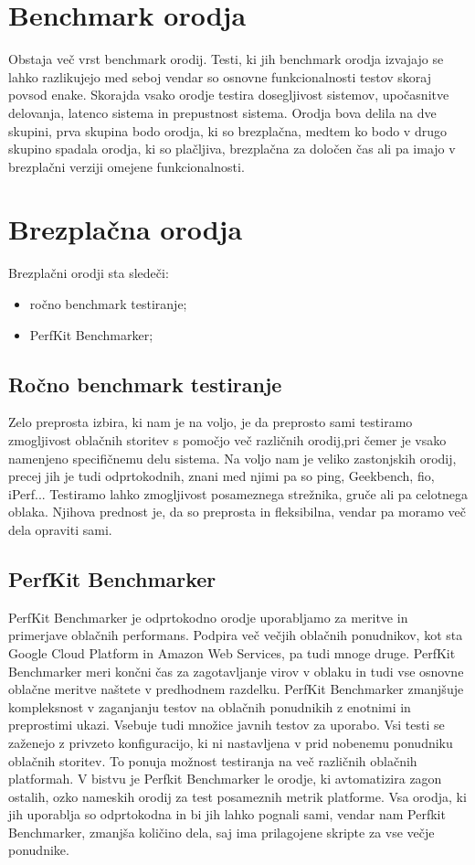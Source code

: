 \section{Benchmark orodja}
Obstaja več vrst benchmark orodij. Testi, ki jih benchmark orodja izvajajo se lahko razlikujejo med seboj vendar so osnovne funkcionalnosti testov skoraj povsod enake. Skorajda vsako orodje testira dosegljivost sistemov, upočasnitve delovanja, latenco sistema in prepustnost sistema. Orodja bova delila na dve skupini, prva skupina bodo orodja, ki so brezplačna, medtem ko bodo v drugo skupino spadala orodja, ki so plačljiva, brezplačna za določen čas ali pa imajo v brezplačni verziji omejene funkcionalnosti.

\section{Brezplačna orodja}
Brezplačni orodji sta sledeči:
\begin{itemize}
\item ročno benchmark testiranje;
\item PerfKit Benchmarker;
\end{itemize}

\subsection{Ročno benchmark testiranje}
Zelo preprosta izbira, ki nam je na voljo, je da preprosto sami testiramo zmogljivost oblačnih storitev s pomočjo več različnih orodij,pri čemer je vsako namenjeno specifičnemu delu sistema. Na voljo nam je veliko zastonjskih orodij, precej jih je tudi odprtokodnih, znani med njimi pa so ping, Geekbench, fio, iPerf... Testiramo lahko zmogljivost posameznega strežnika, gruče ali pa celotnega oblaka. Njihova prednost je, da so preprosta in fleksibilna, vendar pa moramo več dela opraviti sami.

\subsection{PerfKit Benchmarker}
PerfKit Benchmarker je odprtokodno orodje uporabljamo za meritve in primerjave oblačnih performans.
Podpira več večjih oblačnih ponudnikov, kot sta Google Cloud Platform in Amazon Web Services, pa tudi mnoge druge.
PerfKit Benchmarker meri končni čas za zagotavljanje virov v oblaku in tudi vse osnovne oblačne meritve naštete v predhodnem razdelku. PerfKit Benchmarker zmanjšuje kompleksnost v zaganjanju testov na oblačnih ponudnikih z enotnimi in preprostimi ukazi.
Vsebuje tudi množice javnih testov za uporabo. Vsi testi se zaženejo z privzeto konfiguracijo, ki ni nastavljena v prid nobenemu ponudniku oblačnih storitev. To ponuja možnost testiranja na več različnih oblačnih platformah.
V bistvu je Perfkit Benchmarker le orodje, ki avtomatizira zagon ostalih, ozko nameskih orodij za test posameznih metrik platforme. Vsa orodja, ki jih uporablja so odprtokodna in bi jih lahko pognali sami, vendar nam Perfkit Benchmarker, zmanjša količino dela, saj ima prilagojene skripte za vse večje ponudnike.

